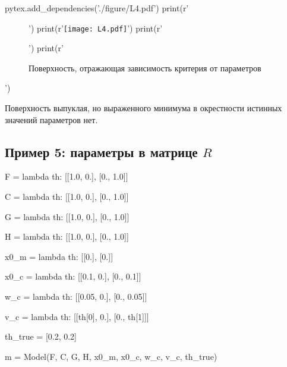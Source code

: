 \documentclass[a4paper,14pt]{extarticle}
\begin{document}
\begin{pycode}
pytex.add_dependencies('./figure/L4.pdf')
print(r'\begin{figure}[H]')
print(r'\texttt{[image: L4.pdf]}')
print(r'\caption{Поверхность, отражающая зависимость критерия от параметров}')
print(r'\end{figure}')
\end{pycode}

Поверхность выпуклая, но выраженного минимума в окрестности истинных значений
параметров нет.

\subsection{Пример 5: параметры в матрице $R$}

\begin{pycode}[model5]
F = lambda th: [[1.0, 0.],
                [0., 1.0]]

C = lambda th: [[1.0, 0.],
                [0., 1.0]]

G = lambda th: [[1.0, 0.],
                [0., 1.0]]

H = lambda th: [[1.0, 0.],
                [0., 1.0]]

x0_m = lambda th: [[0.],
                   [0.]]

x0_c = lambda th: [[0.1, 0.],
                   [0., 0.1]]

w_c = lambda th: [[0.05, 0.],
                  [0., 0.05]]

v_c = lambda th: [[th[0], 0.],
                  [0., th[1]]]

th_true = [0.2, 0.2]

m = Model(F, C, G, H, x0_m, x0_c, w_c, v_c, th_true)
\end{pycode}
\end{document}
